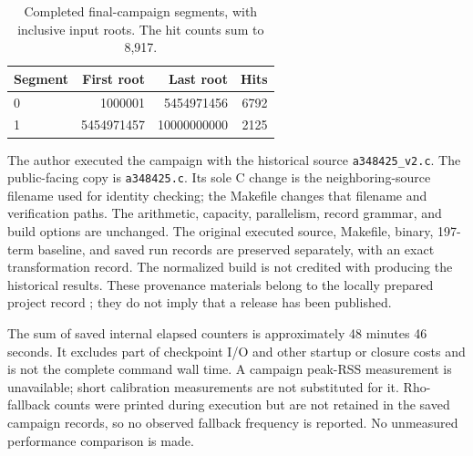 \documentclass[11pt]{article}
\theoremstyle{definition}
\theoremstyle{remark}
\begin{document}
\begin{table}[htbp]
\centering
\caption{Completed final-campaign segments, with inclusive input roots.
The hit counts sum to 8,917.}\label{tab:segments}
\begin{tabular}{lrrr}
\toprule
Segment&First root&Last root&Hits\\
\midrule
0&1000001&5454971456&6792\\
1&5454971457&10000000000&2125\\
\bottomrule
\end{tabular}
\end{table}

The author executed the campaign with the historical source
\texttt{a348425\_v2.c}. The public-facing copy is
\texttt{a348425.c}. Its sole C change is the neighboring-source filename
used for identity checking; the Makefile changes that filename and
verification paths. The arithmetic, capacity, parallelism, record grammar,
and build options are unchanged. The original executed source, Makefile,
binary, 197-term baseline, and saved run records are preserved separately,
with an exact transformation record. The normalized build is not credited
with producing the historical results. These provenance materials belong
to the locally prepared project record \cite{project}; they do not imply
that a release has been published.

The sum of saved internal elapsed counters is approximately 48 minutes
46 seconds. It excludes part of checkpoint I/O and other startup or
closure costs and is not the complete command wall time. A campaign
peak-RSS measurement is unavailable; short calibration measurements
are not substituted for it. Rho-fallback counts were printed during
execution but are not retained in the saved campaign records, so
no observed fallback frequency is reported. No unmeasured performance
comparison is made.
\end{document}
